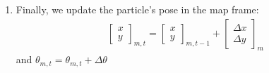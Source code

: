 \documentclass[11pt]{article}
\begin{document}
\begin{enumerate}
\item Finally, we update the particle's pose in the map frame:
\begin{align*}
\begin{bmatrix}
x \\
y
\end{bmatrix}_{m,t} = 
\begin{bmatrix}
x \\
y
\end{bmatrix}_{m,t-1} +
\begin{bmatrix}
\Delta x \\
\Delta y
\end{bmatrix}_{m}
\end{align*}
and $\theta_{m,t} = \theta_{m,t} + \Delta \theta$
\end{enumerate}
\end{document}
